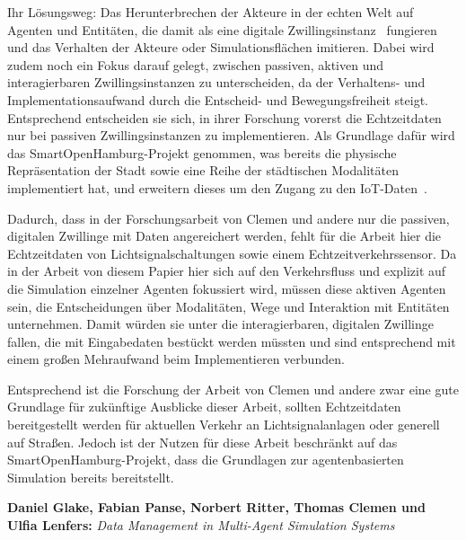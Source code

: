 Ihr Lösungsweg: Das Herunterbrechen der Akteure in der echten Welt auf Agenten und Entitäten, die damit als eine digitale Zwillingsinstanz~\cite{Clemen2021} fungieren und das Verhalten der Akteure oder Simulationsflächen imitieren.
Dabei wird zudem noch ein Fokus darauf gelegt, zwischen passiven, aktiven und interagierbaren Zwillingsinstanzen zu unterscheiden, da der Verhaltens- und Implementationsaufwand durch die Entscheid- und Bewegungsfreiheit steigt.
Entsprechend entscheiden sie sich, in ihrer Forschung vorerst die Echtzeitdaten nur bei passiven Zwillingsinstanzen zu implementieren.
Als Grundlage dafür wird das SmartOpenHamburg-Projekt genommen, was bereits die physische Repräsentation der Stadt sowie eine Reihe der städtischen Modalitäten implementiert hat, und erweitern dieses um den Zugang zu den IoT-Daten~\cite{Clemen2021}.

Dadurch, dass in der Forschungsarbeit von Clemen und andere nur die passiven, digitalen Zwillinge mit Daten angereichert werden, fehlt für die Arbeit hier die Echtzeitdaten von Lichtsignalschaltungen sowie einem Echtzeitverkehrssensor.
Da in der Arbeit von diesem Papier hier sich auf den Verkehrsfluss und explizit auf die Simulation einzelner Agenten fokussiert wird, müssen diese aktiven Agenten sein, die Entscheidungen über Modalitäten, Wege und Interaktion mit Entitäten unternehmen.
Damit würden sie unter die interagierbaren, digitalen Zwillinge fallen, die mit Eingabedaten bestückt werden müssten und sind entsprechend mit einem großen Mehraufwand beim Implementieren verbunden.

Entsprechend ist die Forschung der Arbeit von Clemen und andere zwar eine gute Grundlage für zukünftige Ausblicke dieser Arbeit, sollten Echtzeitdaten bereitgestellt werden für aktuellen Verkehr an Lichtsignalanlagen oder generell auf Straßen.
Jedoch ist der Nutzen für diese Arbeit beschränkt auf das SmartOpenHamburg-Projekt, dass die Grundlagen zur agentenbasierten Simulation bereits bereitstellt.


\textbf{Daniel Glake, Fabian Panse, Norbert Ritter, Thomas Clemen und Ulfia Lenfers:}
\textit{Data Management in Multi-Agent Simulation Systems}

